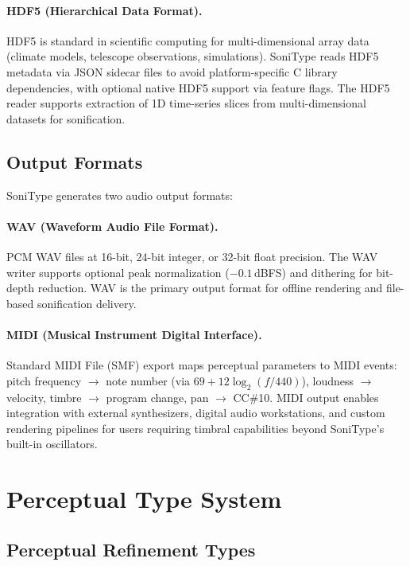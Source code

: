 \documentclass[sigchi, nonacm]{acmart}
\begin{document}
\paragraph{HDF5 (Hierarchical Data Format).} HDF5 is standard in scientific computing for multi-dimensional array data (climate models, telescope observations, simulations). SoniType reads HDF5 metadata via JSON sidecar files to avoid platform-specific C library dependencies, with optional native HDF5 support via feature flags. The HDF5 reader supports extraction of 1D time-series slices from multi-dimensional datasets for sonification.

\subsection{Output Formats}

SoniType generates two audio output formats:

\paragraph{WAV (Waveform Audio File Format).} PCM WAV files at 16-bit, 24-bit integer, or 32-bit float precision. The WAV writer supports optional peak normalization ($-0.1$\,dBFS) and dithering for bit-depth reduction. WAV is the primary output format for offline rendering and file-based sonification delivery.

\paragraph{MIDI (Musical Instrument Digital Interface).} Standard MIDI File (SMF) export maps perceptual parameters to MIDI events: pitch frequency $\to$ note number (via $69 + 12\log_2(f/440)$), loudness $\to$ velocity, timbre $\to$ program change, pan $\to$ CC\#10. MIDI output enables integration with external synthesizers, digital audio workstations, and custom rendering pipelines for users requiring timbral capabilities beyond SoniType's built-in oscillators.

\section{Perceptual Type System}
\label{sec:typesystem}

\subsection{Perceptual Refinement Types}
\end{document}
